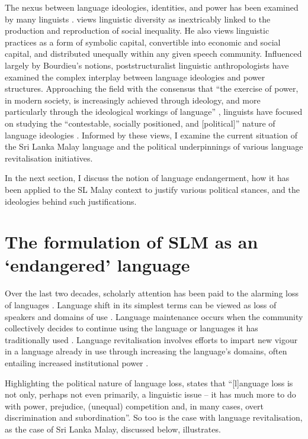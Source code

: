 The nexus between language ideologies, identities, and power has been examined by many linguists \citep{BlackledgeEtAl2004,Heller1995,Heller1999,Hornberger1998, IrvineEtAl2000,Skutnabb-KangasEtAl1998}. \citet{Bourdieu1977,Bourdieu1982,Bourdieu1991} views linguistic diversity as inextricably linked to the production and reproduction of social inequality. He also views linguistic practices as a form of symbolic capital, convertible into economic and social capital, and distributed unequally within any given speech community. Influenced largely by Bourdieu's notions, poststructuralist linguistic anthropologists have examined the complex 
interplay between language ideologies and power structures. Approaching the field with the consensus that ``the exercise of power, in modern society, is increasingly achieved through ideology, and more particularly through the ideological workings of language'' \citep[2]{Fairclough1989}, linguists have focused on studying the ``contestable, socially positioned, and [political]'' nature of language ideologies  \citep[382]{HillEtAl1992}. Informed by these views, I examine the current situation of the Sri Lanka Malay language and the political underpinnings of various language revitalisation initiatives. 

In the next section, I discuss the notion of language endangerment, how it has been applied to the SL Malay context to justify various political stances, and the ideologies behind such justifications. 

\section{The formulation of SLM as an `endangered' language} %

Over the last two decades, scholarly attention has been paid to the alarming loss of languages \citep{Abley2003,Crystal2000,Dalby2003,Florey2005,Kinkade1991,Krauss1992, NettleEtAl2000,RobinsEtAl1991,Wurm1996unesco}. Language shift in its simplest terms can be viewed as loss of speakers and domains of use \citep{Romaine2006}. Language maintenance occurs when the community collectively decides to continue using the language or languages it has traditionally used \citep{Fasold1984}. Language revitalisation involves efforts to impart new vigour in a language already in use through increasing the language's domains, often entailing increased institutional power \citep{Paulston1994}. 

Highlighting the political nature of language loss, \citep[37]{May2004} states that ``[l]anguage loss is not only, perhaps not even primarily, a linguistic issue -- it has much more to do with power, prejudice, (unequal) competition and, in many cases, overt discrimination and subordination''. So too is the case with language revitalisation, as the case of Sri Lanka Malay, discussed below, illustrates.  

